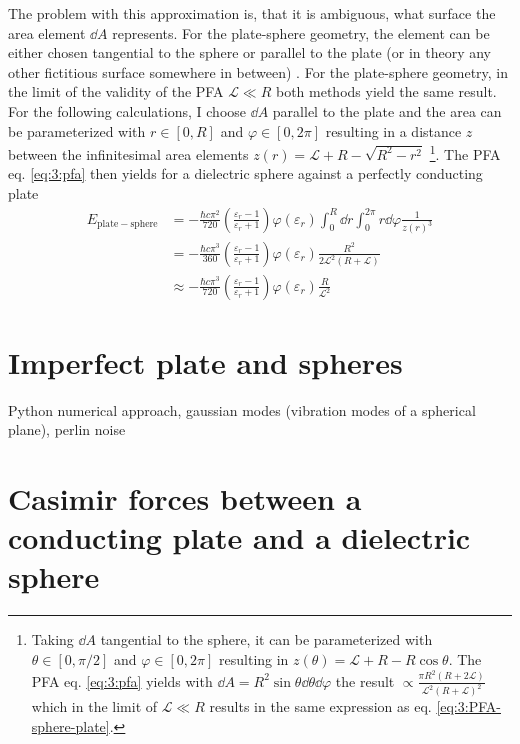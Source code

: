 The problem with this approximation is, that it is ambiguous, what surface the area element $\dd A$ represents. For the plate-sphere geometry, the element can be either chosen tangential to the sphere or parallel to the plate (or in theory any other fictitious surface somewhere in between) \cite{Bulgac_2006}.
For the plate-sphere geometry, in the limit of the validity of the PFA $\mathscr{L} \ll R$ both methods yield the same result.
For the following calculations, I choose $\dd A$ parallel to the plate and the area can be parameterized with $r\in [0, R]$ and $\varphi \in [0, 2\pi]$ resulting in a distance $z$ between the infinitesimal area elements $z(r) = \mathscr{L} + R - \sqrt{R^2 - r^2}$ \footnote{Taking $\dd A$ tangential to the sphere, it can be parameterized with $\theta \in [0, \pi/2]$ and $\varphi \in [0, 2\pi]$ resulting in $z(\theta) = \mathscr{L} + R - R\cos\theta$. The PFA eq. \eqref{eq:3:pfa} yields with $\dd A = R^2\sin\theta\dd\theta\dd\varphi$ the result $\propto \frac{\pi R^2(R + 2\mathscr{L})}{\mathscr{L}^2(R+\mathscr{L})^2}$ which in the limit of $\mathscr{L} \ll R$ results in the same expression as eq. \eqref{eq:3:PFA-sphere-plate}.}. The PFA eq. \eqref{eq:3:pfa} then yields for a dielectric sphere against a perfectly conducting plate
\begin{align}
  E_\mathrm{plate-sphere} &= -\frac{\hbar c \pi^2}{720} \left(\frac{\varepsilon_r - 1}{\varepsilon_r + 1}\right) \varphi(\varepsilon_r) \int_0^R \dd r \int_0^{2\pi} r\dd \varphi \frac{1}{z(r)^3} \\
  &= -\frac{\hbar c \pi^3}{360} \left(\frac{\varepsilon_r - 1}{\varepsilon_r + 1}\right) \varphi(\varepsilon_r) \frac{R^2}{2\mathscr{L}^2(R + \mathscr{L})} \\
  &\approx -\frac{\hbar c \pi^3}{720} \left(\frac{\varepsilon_r - 1}{\varepsilon_r + 1}\right) \varphi(\varepsilon_r) \frac{R}{\mathscr{L}^2} \label{eq:3:PFA-sphere-plate}
\end{align}



\section{Imperfect plate and spheres}

Python numerical approach, gaussian modes (vibration modes of a spherical plane), perlin noise



\section{Casimir forces between a conducting plate and a dielectric sphere}
